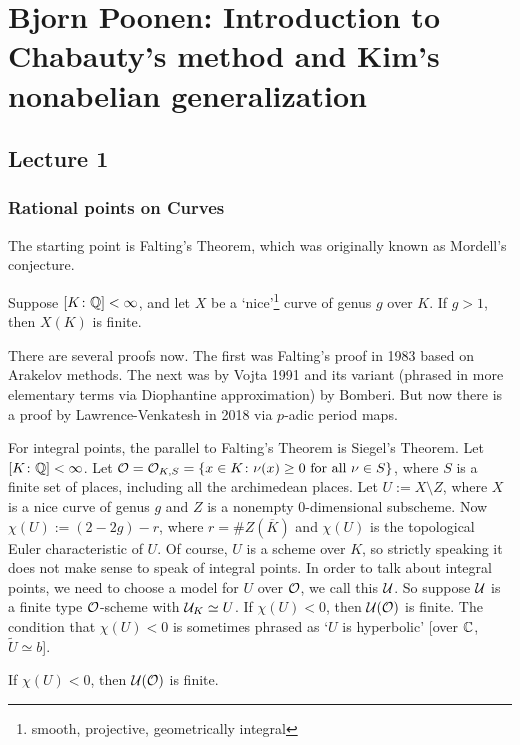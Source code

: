 \newpage
\section{Bjorn Poonen: Introduction to Chabauty's method and Kim's nonabelian generalization}
\subsection{Lecture 1}
\subsubsection{Rational points on Curves}

The starting point is Falting's Theorem, which was originally known as Mordell's conjecture.

\begin{thm}[Falting's, 1983]
Suppose $[K \colon \mathbb{Q}] < \infty$, and let $X$ be a `nice'\footnote{smooth, projective, geometrically integral} curve of genus $g$ over $K$. If $g>1$, then $X(K)$ is finite. 
\end{thm}


There are several proofs now. The first was Falting's proof in 1983 based on Arakelov methods. The next was by Vojta 1991 and its variant (phrased in more elementary terms via Diophantine approximation) by Bomberi. But now there is a proof by Lawrence-Venkatesh in 2018 via $p$-adic period maps. 


For integral points, the parallel to Falting's Theorem is Siegel's Theorem. Let $[K \colon \mathbb{Q}] < \infty$. Let $\mathcal{O}= \mathcal{O}_{K,S}= \{ x \in K \colon \nu(x) \geq 0 \text{ for all } \nu \in S \}$, where $S$ is a finite set of places, including all the archimedean places. Let $U:= X \setminus Z$, where $X$ is a nice curve of genus $g$ and $Z$ is a nonempty 0-dimensional subscheme. Now $\chi(U):= (2-2g) - r$, where $r= \#Z(\overline{K})$ and $\chi(U)$ is the topological Euler characteristic of $U$. Of course, $U$ is a scheme over $K$, so strictly speaking it does not make sense to speak of integral points. In order to talk about integral points, we need to choose a model for $U$ over $\mathcal{O}$, we call this $\mathcal{U}$. So suppose $\mathcal{U}$ is a finite type $\mathcal{O}$-scheme with $\mathcal{U}_K\simeq U$. If $\chi(U)< 0$, then $\mathcal{U}(\mathcal{O})$ is finite. The condition that $\chi(U)<0$ is sometimes phrased as `$U$ is hyperbolic' [over $\mathbb{C}$, $\widetilde{U} \simeq b$]. 


\begin{thm}
If $\chi(U)< 0$, then $\mathcal{U}(\mathcal{O})$ is finite. 
\end{thm}


